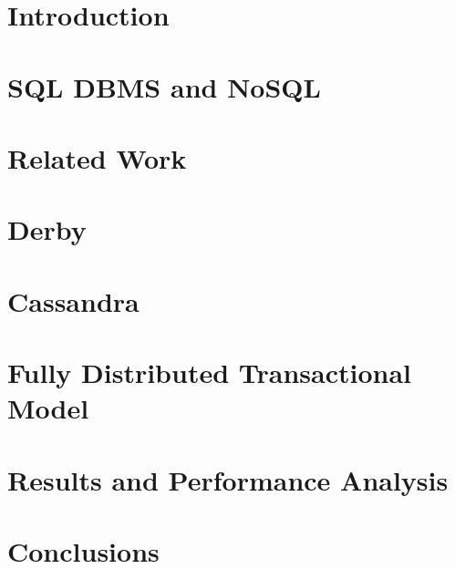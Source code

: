 \documentclass[11pt,a4paper,twoside]{book} %
\begin{document}

	
	\chapter{Introduction}
        
		\mbox{}
    \chapter{SQL DBMS and NoSQL}
        
   	    \mbox{}	
	\chapter{Related Work}
	    
		\mbox{}	
    \chapter{Derby}
       
   	   \mbox{}
	\chapter{Cassandra}
	\label{chap:cass}
       
       \mbox{}
	\chapter{Fully Distributed Transactional Model}
	\label{chap:fdtm}
       
   	   \mbox{}
    \chapter{Results and Performance Analysis}
       
   	   \mbox{}	
		\thispagestyle{plain}
		\mbox{}
   \chapter{Conclusions}
   	
   	\newpage
   	\thispagestyle{plain}
   	\mbox{}

%	
	
	
	
	\appendix
\end{document}
